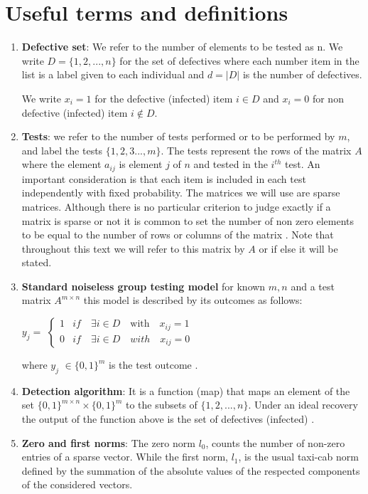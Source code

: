 \section{Useful terms and definitions}
\begin{enumerate}
	\item \textbf{Defective set}: We refer to the number of elements to be tested as n. We write $ D = \{1,2, ..., n\} $ for the set of defectives where each number item in the list is a label given to each individual  and $ d  = |D|$ is the number of defectives.
	
	We write $ x_i  = 1$ for the defective (infected) item   $i\in D $ and $ x_i = 0 $ for non defective (infected) item $ i \notin D $.
	\item \textbf{Tests}: we refer to the number of tests performed or to be performed by $m$, and label the tests $ \{1,2,3 ..., m\} $. The tests represent the rows of the matrix $ A $ where the element $ a_{ij} $ is element $ j $ of $ n $ and tested in the $ i^{th} $ test. An important consideration is that each item is included in each test independently with fixed probability. The matrices we will use are sparse matrices. Although there is no particular criterion to judge exactly if a matrix is sparse or not it is common to set the number of non zero elements to be equal to the number of rows or columns of the matrix \cite{aldridge}. Note that throughout this text we will refer to this matrix by $ A $ or if else it will be stated.   
	\item \textbf{Standard noiseless group testing model} for known $m,n$ and a test matrix $ A^{m\times n} $ this model is described by its outcomes as follows:
	
	\begin{center} $y_{j} =$  
		$\begin{cases}
		1 & if \quad \exists   i \in D  \quad \text{with}  \quad x_{ij} = 1\\
		0 & if \quad \exists   i \in D  \quad with  \quad x_{ij} = 0
		\end{cases}$
	\end{center}
	where $ y_j $ $ \in \{0,1\}^m $ is the test outcome \cite{aldridge}.
	\item \textbf{Detection algorithm}:
	It is a function (map) that maps an element of the set $ \{0,1\}^{m\times n} \times \{0,1\}^m $ to the subsets of $ \{1,2,..., n\} $. Under an ideal recovery the output of the function above is the set of defectives (infected) \cite{aldridge}.  
	\item \textbf{Zero and first norms}: The zero norm $ l_0  $,  counts the number of non-zero entries of a sparse vector. While the first norm, $ l_1 $,  is the usual taxi-cab norm defined by the summation of the absolute values of the respected components of the considered vectors.      
\end{enumerate}      

